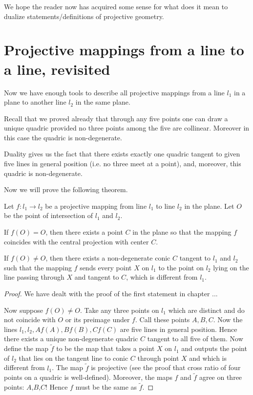 We hope the reader now has acquired some sense for what does it mean to dualize statements/definitions of projective geometry.

\section{Projective mappings from a line to a line, revisited}

Now we have enough tools to describe all projective mappings from a line $l_1$ in a plane to another line $l_2$ in the same plane.

Recall that we proved already that through any five points one can draw a unique quadric provided no three points among the five are collinear. Moreover in this case the quadric is non-degenerate.

Duality gives us the fact that there exists exactly one quadric tangent to given five lines in general position (i.e. no three meet at a point), and, moreover, this quadric is non-degenerate.

Now we will prove the following theorem.

\begin{theorem}
Let $f:l_1\to l_2$ be a projective mapping from line $l_1$ to line $l_2$ in the plane. Let $O$ be the point of intersection of $l_1$ and $l_2$.

If $f(O)=O$, then there exists a point $C$ in the plane so that the mapping $f$ coincides with the central projection with center $C$.

If $f(O)\neq O$, then there exists a non-degenerate conic $C$ tangent to $l_1$ and $l_2$ such that the mapping $f$ sends every point $X$ on $l_1$ to the point on $l_2$ lying on the line passing through $X$ and tangent to $C$, which is different from $l_1$.
\end{theorem}

\begin{proof}
We have dealt with the proof of the first statement in chapter ...

Now suppose $f(O)\neq O$. Take any three points on $l_1$ which are distinct and do not coincide with $O$ or its preimage under $f$. Call these points $A,B,C$. Now the lines $l_1,l_2,Af(A),Bf(B),Cf(C)$ are five lines in general position. Hence there exists a unique non-degenerate quadric $C$ tangent to all five of them. Now define the map $\tilde{f}$ to be the map that takes a point $X$ on $l_1$ and outputs the point of $l_2$ that lies on the tangent line to conic $C$ through point $X$ and which is different from $l_1$. The map $\tilde{f}$ is projective (see the proof that cross ratio of four points on a quadric is well-defined). Moreover, the maps $f$ and $\tilde{f}$ agree on three points: $A$,$B$,$C$! Hence $f$ must be the same as $\tilde{f}$.
\end{proof}